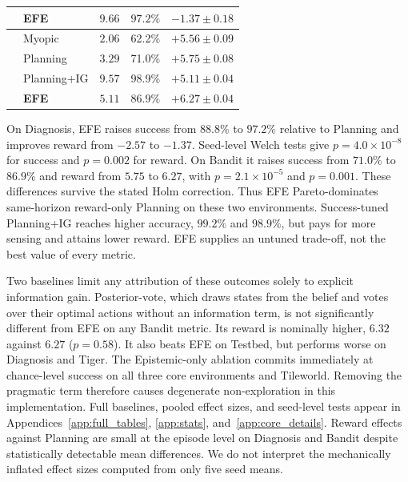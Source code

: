 \begin{table}[ht]
\begin{tablebody}
\begin{tabular}{llccc}
& \textbf{EFE} & $\mathbf{9.66}$ & $\mathbf{97.2\%}$ & $\mathbf{-1.37 \pm 0.18}$ \\
\midrule
{} & Myopic & $2.06$ & 62.2\% & $+5.56 \pm 0.09$ \\
& Planning & $3.29$ & 71.0\% & $+5.75 \pm 0.08$ \\
& Planning+IG & $9.57$ & 98.9\% & $+5.11 \pm 0.04$ \\
& \textbf{EFE} & $\mathbf{5.11}$ & $\mathbf{86.9\%}$ & $\mathbf{+6.27 \pm 0.04}$ \\
\bottomrule
\end{tabular}
\end{tablebody}
\end{table}

On Diagnosis, EFE raises success from $88.8\%$ to $97.2\%$ relative to Planning and improves reward from $-2.57$ to $-1.37$. Seed-level Welch tests give $p=4.0{\times}10^{-8}$ for success and $p=0.002$ for reward. On Bandit it raises success from $71.0\%$ to $86.9\%$ and reward from $5.75$ to $6.27$, with $p=2.1{\times}10^{-5}$ and $p=0.001$. These differences survive the stated Holm correction. Thus EFE Pareto-dominates same-horizon reward-only Planning on these two environments. Success-tuned Planning+IG reaches higher accuracy, $99.2\%$ and $98.9\%$, but pays for more sensing and attains lower reward. EFE supplies an untuned trade-off, not the best value of every metric.

Two baselines limit any attribution of these outcomes solely to explicit information gain. Posterior-vote, which draws states from the belief and votes over their optimal actions without an information term, is not significantly different from EFE on any Bandit metric. Its reward is nominally higher, $6.32$ against $6.27$ ($p=0.58$). It also beats EFE on Testbed, but performs worse on Diagnosis and Tiger. The Epistemic-only ablation commits immediately at chance-level success on all three core environments and Tileworld. Removing the pragmatic term therefore causes degenerate non-exploration in this implementation. Full baselines, pooled effect sizes, and seed-level tests appear in Appendices~\ref{app:full_tables}, \ref{app:stats}, and~\ref{app:core_details}. Reward effects against Planning are small at the episode level on Diagnosis and Bandit despite statistically detectable mean differences. We do not interpret the mechanically inflated effect sizes computed from only five seed means.

